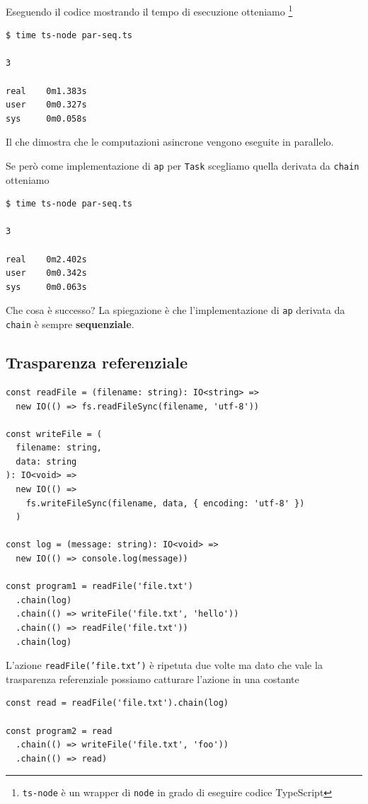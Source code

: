 \documentclass[12pt]{article}
\begin{document}
Eseguendo il codice mostrando il tempo di esecuzione otteniamo
\footnote{\texttt{ts-node} è un wrapper di \texttt{node} in grado di eseguire codice TypeScript}

\begin{verbatim}
$ time ts-node par-seq.ts

3

real    0m1.383s
user    0m0.327s
sys     0m0.058s
\end{verbatim}

Il che dimostra che le computazioni asincrone vengono eseguite in parallelo.

Se però come implementazione di \texttt{ap} per \texttt{Task} scegliamo quella derivata da \texttt{chain} otteniamo

\begin{verbatim}
$ time ts-node par-seq.ts

3

real    0m2.402s
user    0m0.342s
sys     0m0.063s
\end{verbatim}

Che cosa è successo? La spiegazione è che l'implementazione di \texttt{ap} derivata da \texttt{chain} è sempre \textbf{sequenziale}.

\subsection{Trasparenza referenziale}

\begin{verbatim}
const readFile = (filename: string): IO<string> =>
  new IO(() => fs.readFileSync(filename, 'utf-8'))

const writeFile = (
  filename: string,
  data: string
): IO<void> =>
  new IO(() =>
    fs.writeFileSync(filename, data, { encoding: 'utf-8' })
  )

const log = (message: string): IO<void> =>
  new IO(() => console.log(message))

const program1 = readFile('file.txt')
  .chain(log)
  .chain(() => writeFile('file.txt', 'hello'))
  .chain(() => readFile('file.txt'))
  .chain(log)
\end{verbatim}

L'azione \texttt{readFile('file.txt')} è ripetuta due volte ma dato che vale la trasparenza referenziale possiamo catturare l'azione in una costante

\begin{verbatim}
const read = readFile('file.txt').chain(log)

const program2 = read
  .chain(() => writeFile('file.txt', 'foo'))
  .chain(() => read)
\end{verbatim}
\end{document}
